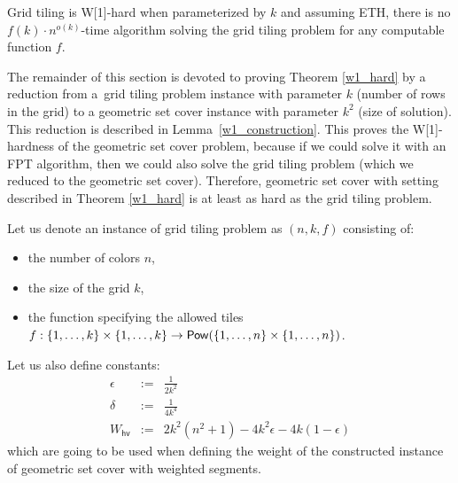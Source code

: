 

\begin{tw}
\label{grid_tiling_w1_hard}
\textbf{\cite{marx_grid_tiling}}
Grid tiling is W[1]-hard when parameterized by $k$ and
assuming ETH, there is no $f(k)\cdot n^{o(k)}$-time
algorithm solving the grid tiling problem
for any computable function $f$.
\end{tw}

The remainder of this section is devoted to proving Theorem \ref{w1_hard}
by a reduction from a~grid tiling problem instance
with parameter $k$ (number of rows in the grid)
to a geometric set cover instance with parameter $k^2$ (size of solution).
This reduction is described in Lemma~\ref{w1_construction}.
This proves the W[1]-hardness of the geometric set cover problem,
because if we could solve it with an FPT algorithm,
then we could also solve the grid tiling problem
(which we reduced to the geometric set cover).
Therefore, geometric set cover with setting
described in Theorem \ref{w1_hard}
is at least as hard as the grid tiling problem.

\newcommand{\hvWeight}{W_{\mathsf{hv}}}
\newcommand{\solWeight}{\hvWeight+k^2\delta }
\newcommand{\instanceSetCover}{(\points, \sets, w, 3k^2+2k)}
\newcommand{\instanceGridTiling}{(n,k,f)}
\newcommand{\yes}{\texttt{YES}}
\newcommand{\no}{\texttt{NO}}

Let us denote an instance of grid tiling problem as $\instanceGridTiling$ consisting of:
\begin{itemize}
\item the number of colors $n$,
\item the size of the grid $k$,
\item the function specifying the allowed tiles
$f : \{1, \ldots, k\} \times \{1, \ldots, k\} \rightarrow \mathsf{Pow}(\{1, \ldots, n\} \times \{1, \ldots, n\})$.
\end{itemize}

Let us also define constants: 
\begin{eqnarray*}
\epsilon & := & \frac{1}{2k^2} \\
\delta & := & \frac{1}{4k^4} \\
\hvWeight & := & 2k^2(n^2+1) -4k^2\epsilon -4k(1-\epsilon)
\end{eqnarray*}
which are going to be used when defining the weight of the constructed
instance of geometric set cover with weighted segments.


